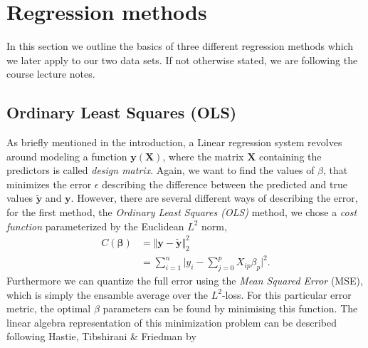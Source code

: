\documentclass[a4paper, twocolumn]{article}
\begin{document}
\section{Regression methods}
In this section we outline the basics of three different regression methods which we later apply to our two data sets. If not otherwise stated, we are following the course lecture notes\autocite{MHJ}. 
\subsection{Ordinary Least Squares (OLS)}
As briefly mentioned in the introduction, a Linear regression system revolves around modeling a function $\mathbf{y}(\mathbf{X})$, where the matrix $\mathbf{X}$ containing the predictors is called \textit{design matrix}. Again, we want to find the values of $\beta$, that minimizes the error $\epsilon$ describing the difference between the predicted and true values $\mathbf{\tilde{y}}$ and $\mathbf{y}$.
However, there are several different ways of describing the error, for the first method, the \textit{Ordinary Least Squares (OLS)} method, we chose a \textit{cost function} parameterized by the Euclidean $L^2$ norm,
\begin{align}
C(\bm\beta) &= \Vert \mathbf{y} - \tilde{\mathbf{y}}\Vert_2^2 \nonumber \\
&= \sum_{i=1}^n \Big| y_i - \sum_{j=0}^p X_{ip} \beta_p \Big|^2. \label{eq:cost}
\end{align}
Furthermore we can quantize the full error using the \textit{Mean Squared Error} (MSE), which is simply the ensamble average over the $L^2$-loss. 
For this particular error metric, the optimal $\beta$ parameters can be found by minimising this function.
The linear algebra representation of this minimization problem can be described following Hastie, Tibshirani \& Friedman\autocite{trevor2009elements} by
\end{document}
